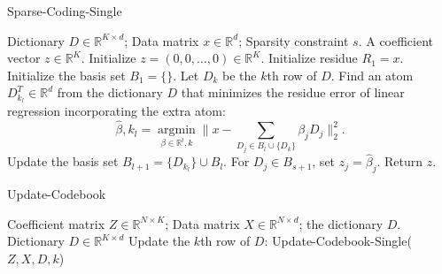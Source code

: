   \begin{algorithm}[H] 
       \caption{Sparse-Coding-Single}
       \label{alg:mps}
       \begin{algorithmic}
       \Require Dictionary $D\in\mathbb R^{K\times d}$; Data matrix $x\in \mathbb R^d$; Sparsity constraint $s$. 
       \Ensure A coefficient vector $z\in\mathbb R^K$.
          \State Initialize $z=(0,0,\dots,0)\in\mathbb R^K$. 
          \State Initialize residue $R_1 = x$. Initialize the basis set $B_1=\{\}$. 
            \State Let $D_k$ be the $k$th row of $D$.
            \State Find an atom $D_{k_l}^T \in\mathbb R^d$ from the  dictionary $D$ that minimizes the residue error of linear regression incorporating the extra atom:
            \begin{equation*}
            \hat{\beta},k_l = \operatorname*{argmin}_{\beta\in\mathbb R^l,k} \|x - \sum_{D_j\in B_{l}\cup\{D_{k}\}} \beta_j D_j\|_2^2.
            \end{equation*}            
            \State Update the basis set $B_{l+1}=\{D_{k_l}\}\cup B_l$. 
          \EndFor
          \State For $D_j\in B_{s+1}$, set $z_j = \hat{\beta}_j$. 
          \State Return $z$.  
    \EndFunction
       \end{algorithmic}
 \end{algorithm}



  \begin{algorithm}[H] 
       \caption{Update-Codebook}
       \label{alg:uc}
       \begin{algorithmic}
       \Require Coefficient matrix $Z\in\mathbb R^{N\times K}$; Data matrix $X\in\mathbb R^{N\times d}$; the dictionary $D$.
       \Ensure Dictionary $D\in\mathbb R^{K\times d}$
            \State Update the $k$th row of $D$: Update-Codebook-Single($Z, X, D, k$)
          \EndFor
              \EndFunction
       \end{algorithmic}
 \end{algorithm}

